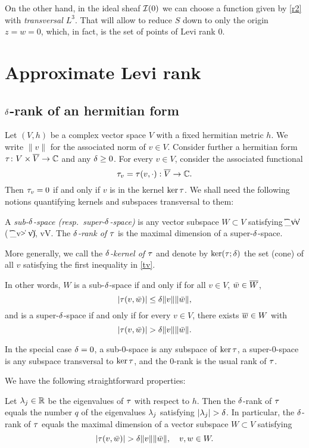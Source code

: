 \documentclass[12pt]{amsart}
\begin{document}
On the other hand, 
in the ideal sheaf ${\mathcal{I}}(0)$
we can choose a function given by \eqref{r2}
with {\em transversal $L^3$}.
That will allow to reduce $S$ down to only the origin 
$z=w=0$,
which, in fact, is the set of points of Levi rank $0$.
\ee



\section{Approximate Levi rank}
\subsection{$\delta$-rank of an hermitian form}
Let $(V, h)$ be a complex vector space $V$
with a fixed hermitian metric $h$.
We write $\|v\|$ for the associated norm of $v\in V$.
Consider further a hermitian form
$\tau\colon V\times \overline{V}\to {\mathbb{C}}$  
and any $\delta\ge 0$.
For every $v\in V$, consider the associated functional
$$
	\tau_v=\tau(v, \cdot) : \overline{V} \to {\mathbb{C}}.
$$
Then $\tau_v=0$ if and only if $v$ is in the kernel $\ker\tau$.
We shall need the following notions quantifying
kernels and subspaces transversal to them:

\bd
	A {\em sub-$\delta$-space (resp.\ super-$\delta$-space)}
	is any vector subspace $W\subset V$ satisfying
	\beq{}
		\|\t_v\| \le \de \|v\| 
		\quad
		( \|\t_v\| > \de \|v\|),
		\quad
		v\in V.
	\eeq
	The {\em $\delta$-rank of $\tau$} is the maximal dimension of a
	super-$\delta$-space.
	
	More generally, we call the {\em $\delta$-kernel of $\tau$}
	and denote by $\ker(\tau; \delta)$
	the set (cone) of all $v$ satisfying the first inequality in \eqref{tv}.
\ed

In other words, $W$ is a sub-$\delta$-space if and only if
for all $v\in V$, ${\bar w}\in \overline{W}$,
$$
	|\tau(v,{\bar w})| \le \delta \|v\| \|{\bar w}\|,
$$
and is a super-$\delta$-space if and only if
for every $v\in V$, there exists $\overline{w}\in W$ with
$$
	 |\tau(v,{\bar w})| > \delta \|v\| \|{\bar w}\|.
$$


\br
In the special case $\delta=0$,
a sub-$0$-space is any subspace of $\ker\tau$,
a super-$0$-space is any subspace transversal to $\ker\tau$,
and the $0$-rank is the usual rank of $\tau$.
\er

We have the following straightforward properties:

\bl
Let $\lambda_j\in {\mathbb{R}}$ be the eigenvalues of $\tau$
with respect to $h$.
Then the $\delta$-rank of $\tau$
equals the number $q$ of the eigenvalues $\lambda_j$
satisfying $|\lambda_j| > \delta$.
In particular, the $\delta$-rank of $\tau$ equals 
the maximal dimension of a vector subspace $W\subset V$ satisfying
$$
	|\tau(v, {\bar w})| > \delta \|v\| \|{\bar w}\|, \quad v, w\in W.
$$
\el
\end{document}
